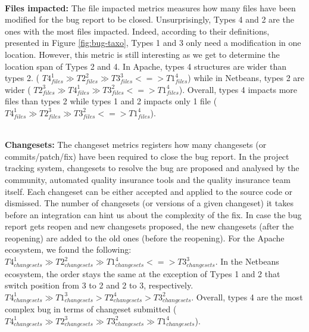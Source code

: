 \\ \vspace{0.1cm} {\bf Files impacted: } The file impacted metrics measures how many files have been modified for the bug report to be closed.
Unsurprisingly, Types 4 and 2 are the ones with the most files impacted.
Indeed, according to their definitions, presented in Figure \ref{fig:bug-taxo}, Types 1 and 3 only need a modification in one location.
However, this metric is still interesting as we get to determine the location span of Types 2 and 4.
In Apache, types 4 structures are wider than types 2.
(
$
T4_{files}^1
 \gg
T2_{files}^2
 \gg
T3_{files}^3
< = >
T1_{files}^4
$)
while in Netbeans, types 2 are wider (
$
T2_{files}^3
 \gg
T4_{files}^1
 \gg
T3_{files}^2
< = >
T1_{files}^4
$).
Overall, types 4 impacts more files than types 2 while types 1 and 2 impacts only 1 file (
$
T4_{files}^1
 \gg
T2_{files}^3
 \gg
T3_{files}^2
< = >
T1_{files}^4
$).

\\ \vspace{0.1cm} {\bf Changesets: } The changeset metrics registers how many changesets (or commits/patch/fix) have been required to close the bug report.
In the project tracking system, changesets to resolve the bug are proposed and analysed by the community, automated quality insurance tools and the quality insurance team itself.
Each changeset can be either accepted and applied to the source code or dismissed.
The number of changesets (or versions of a given changeset) it takes before an integration can hint us about the complexity of the fix.
In case the bug report gets reopen and new changesets proposed, the new changesets (after the reopening) are added to the old ones (before the reopening).
For the Apache ecosystem, we found the following:
$
T4_{changesets}^1
 \gg
T2_{changesets}^2
 \gg
T1_{changesets}^4
 <=>
T3_{changesets}^3
$.
In the Netbeans ecosystem, the order stays the same at the exception of Types 1 and 2 that switch position from 3 to 2 and 2 to 3, respectively.
$
T4_{changesets}^1
 \gg
T1_{changesets}^3
 >
T2_{changesets}^4
 >
T3_{changesets}^2
$.
Overall, types 4 are the most complex bug in terms of changeset submitted (
$
T4_{changesets}^1
 \gg
T2_{changesets}^3
 \gg
T3_{changesets}^2
 \gg
T1_{changesets}^4
$).

